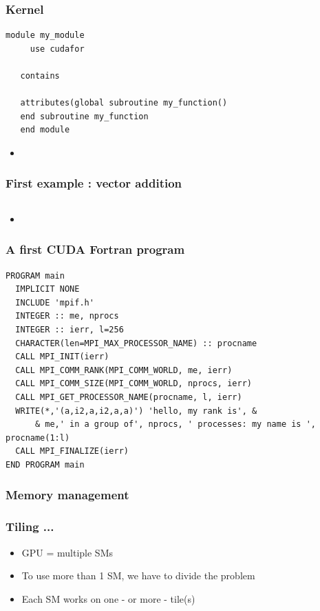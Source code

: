 \begin{frame}[containsverbatim]
	\frametitle{Kernel}

\begin{lstlisting}[language=FORTRAN,frame=lines]
   module my_module
     use cudafor

   contains

   attributes(global subroutine my_function()
   end subroutine my_function
   end module
\end{lstlisting}
	\begin{itemize}
	\item {}
	\end{itemize}
\end{frame}


\begin{frame}[containsverbatim]
	\frametitle{First example : vector addition}

\begin{lstlisting}[language=FORTRAN,frame=lines]
\end{lstlisting}
	\begin{itemize}
	\item {}
	\end{itemize}
\end{frame}




\begin{frame}[containsverbatim]
	\frametitle{A first CUDA Fortran program}

\begin{lstlisting}[language=FORTRAN,frame=lines]
PROGRAM main
  IMPLICIT NONE
  INCLUDE 'mpif.h'
  INTEGER :: me, nprocs
  INTEGER :: ierr, l=256
  CHARACTER(len=MPI_MAX_PROCESSOR_NAME) :: procname
  CALL MPI_INIT(ierr)
  CALL MPI_COMM_RANK(MPI_COMM_WORLD, me, ierr)
  CALL MPI_COMM_SIZE(MPI_COMM_WORLD, nprocs, ierr)
  CALL MPI_GET_PROCESSOR_NAME(procname, l, ierr)
  WRITE(*,'(a,i2,a,i2,a,a)') 'hello, my rank is', &
      & me,' in a group of', nprocs, ' processes: my name is ', procname(1:l)
  CALL MPI_FINALIZE(ierr)
END PROGRAM main
\end{lstlisting}
\end{frame}


\subsubsection{Memory management}

\begin{frame}[containsverbatim]
	\frametitle{Tiling ...}

	\begin{itemize}
	\item {GPU = multiple SMs}
	\item {To use more than 1 SM, we have to divide the problem}
	\item {Each SM works on one - or more - tile(s)}
	\end{itemize}
\end{frame}

